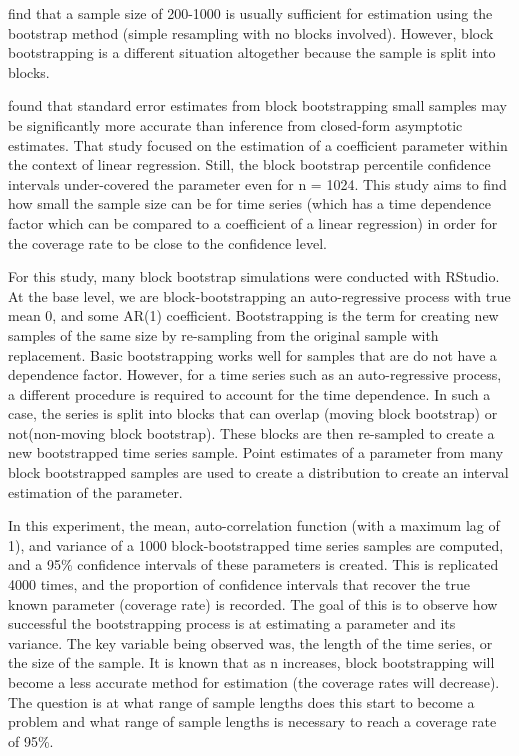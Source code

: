 \documentclass[12pt, letterpaper, titlepage]{article}
\begin{document}
\citet{nevitt2001performance} find that a sample size of 200-1000 is usually sufficient for estimation using the bootstrap method (simple resampling with no blocks involved). However, block bootstrapping is a different situation altogether because the sample is split into blocks.

\citet{goncalves2005bootstrap} found that standard error estimates from block bootstrapping small 
samples 
may be significantly more accurate than inference from closed-form asymptotic estimates. That study focused on the estimation of a coefficient parameter within the context of linear regression. Still, the block bootstrap percentile confidence intervals under-covered the parameter even for n = 1024. This study aims to find how small the sample size can be for time series (which has a time dependence factor which can be compared to a coefficient of a linear regression) in order for the coverage rate to be close to the confidence level.

For this study, many block bootstrap simulations were conducted with RStudio. At the base
level, we are block-bootstrapping an auto-regressive process with true mean 0, and some AR(1) coefficient.
Bootstrapping is the term for creating new samples of the same size by re-sampling from
the original sample with replacement. Basic bootstrapping works well for samples
that are do not have a dependence factor. However, for a time series such as an auto-regressive process,
a different procedure is required to account for the time dependence. In such a case,
the series is split into blocks that can overlap (moving block bootstrap) or not(non-moving block bootstrap). These blocks are then re-sampled to create a new
bootstrapped time series sample. Point estimates of a parameter from many block bootstrapped samples are used to create a distribution to create an interval estimation of the parameter.

In this experiment, the mean, auto-correlation function (with a maximum lag of 1), and variance of a 1000 block-bootstrapped time series samples are computed, 
and a 95\% confidence intervals of these parameters is created. This is replicated 4000 times, 
and the proportion of confidence intervals that recover the true known parameter 
(coverage rate) is recorded. The goal of this is to observe how successful the bootstrapping process
is at estimating a parameter and its variance. The key variable being observed was, 
the length of the time series, or the size of the sample. It is known that as n
increases, block bootstrapping will become a less accurate method for estimation
(the coverage rates will decrease). The question is at what range of sample lengths does this
start to become a problem and what range of sample lengths is necessary to reach a coverage rate of 95\%.
\end{document}
